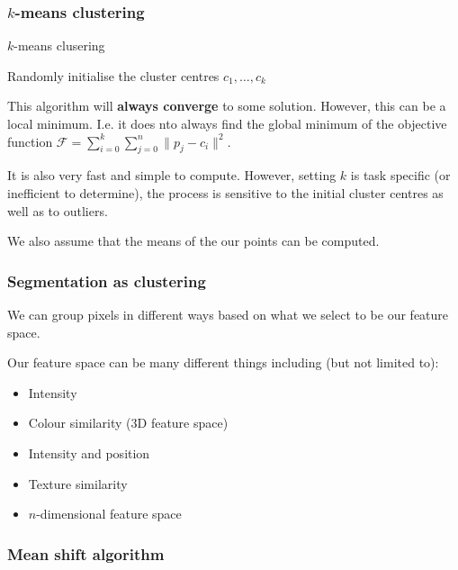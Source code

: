 \documentclass{article}
\begin{document}
\subsubsection{$k$-means clustering}

\begin{algorithm}
  \caption{$k$-means clusering}
  Randomly initialise the cluster centres $c_{1},\ldots,c_{k}$

\end{algorithm}

This algorithm will \textbf{always converge} to some solution. However, this can be a local minimum. I.e. it does nto always find the global minimum of the objective function $\mathcal{F} = \sum_{i=0}^k \sum_{j=0}^n \| p_{j} - c_{i}\|^{2}$.

It is also very fast and simple to compute. However, setting $k$ is task specific (or inefficient to determine), the process is sensitive to the initial cluster centres as well as to outliers.

We also assume that the means of the our points can be computed.

\subsubsection{Segmentation as clustering}

We can group pixels in different ways based on what we select to be our feature space.

Our feature space can be many different things including (but not limited to):

\begin{itemize}
  \item Intensity
  \item Colour similarity (3D feature space)
  \item Intensity and position
  \item Texture similarity
  \item $n$-dimensional feature space
\end{itemize}

\subsubsection{Mean shift algorithm}
\end{document}
